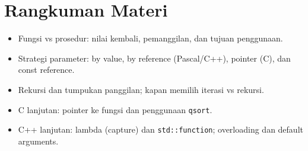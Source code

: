 \documentclass[../main.tex]{subfiles}
\begin{document}
\section{Rangkuman Materi}
\begin{itemize}
  \item Fungsi vs prosedur: nilai kembali, pemanggilan, dan tujuan penggunaan.
  \item Strategi parameter: by value, by reference (Pascal/C++), pointer (C), dan const reference.
  \item Rekursi dan tumpukan panggilan; kapan memilih iterasi vs rekursi.
  \item C lanjutan: pointer ke fungsi dan penggunaan \texttt{qsort}.
  \item C++ lanjutan: lambda (capture) dan \texttt{std::function}; overloading dan default arguments.
\end{itemize}
\end{document}
